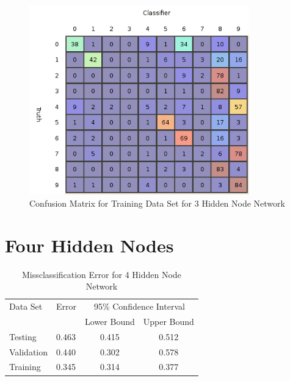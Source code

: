 \documentclass{article}
\begin{document}
\begin{figure}
\centering
\includegraphics[width=0.85\textwidth]{data/final/3_train_confusion.png}
\caption{Confusion Matrix for Training Data Set for 3 Hidden Node Network}
\label{trainconfusion3}
\end{figure}

\section{Four Hidden Nodes}\label{hidden4}

\begin{table}
\caption{Missclassification Error for 4 Hidden Node Network}
\begin{center}
\begin{tabular}{llcc}
\toprule
Data Set & Error & \multicolumn{2}{c}{95\% Confidence Interval} \\
\cmidrule(r){3-4}
& & Lower Bound & Upper Bound \\
\midrule
Testing       & 0.463 &  0.415 & 0.512  \\
Validation    & 0.440 &  0.302 & 0.578  \\
Training      & 0.345 &  0.314 & 0.377  \\
\bottomrule
\end{tabular}
\label{table4}
\end{center}
\end{table}
\end{document}
